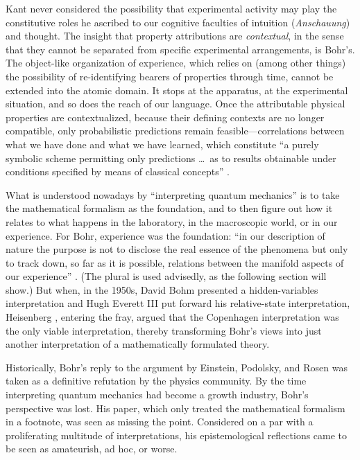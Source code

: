\documentclass[12pt]{article}
\begin{document}
Kant never considered the possibility that experimental activity may play the constitutive roles he ascribed to our cognitive faculties of {intuition} (\emph{Anschauung}) and thought. The insight that property attributions are \emph{contextual}, in the sense that they cannot be separated from specific experimental arrangements, is Bohr's. The object-like organization of experience, which relies on (among other things) the possibility of re-identifying bearers of properties through time, cannot be extended into the atomic domain. It stops at the apparatus, at the experimental situation, and so does the reach of our language. Once the attributable physical properties are contextualized, because their defining contexts are no longer compatible, only probabilistic predictions remain feasible---correlations between what we have done and what we have learned, which constitute ``a purely symbolic scheme permitting only predictions \dots\ as to results obtainable under conditions specified by means of classical concepts'' \cite{Bohr-APHKa}.

What is understood nowadays by ``interpreting quantum mechanics'' is to take the mathematical formalism as the foundation, and to then figure out how it relates to what happens in the laboratory, in the macroscopic world, or in our experience. For Bohr, experience was the foundation: ``in our description of nature the purpose is not to disclose the real essence of the phenomena but only to track down, so far as it is possible, relations between the manifold aspects of our experience'' \cite{BohrATDNa}. (The plural is used advisedly, as the following section will show.) But when, in the 1950s, David Bohm \cite{BohmHV} presented a hidden-variables interpretation and Hugh Everett III \cite{EverettRSF} put forward his relative-state interpretation, Heisenberg \cite{Heisenberg_PP}, entering the fray, argued that the Copenhagen interpretation was the only viable interpretation, thereby transforming Bohr's views into just another interpretation of a mathematically formulated theory.

Historically, Bohr's reply \cite{BohrEPRreply} to the argument by Einstein, Podolsky, and Rosen \cite{EPR} was taken as a definitive refutation by the physics community. By the time interpreting quantum mechanics had become a growth industry, Bohr's perspective was lost. His paper, which only treated the mathematical formalism in a footnote, was seen as missing the point. Considered on a par with a proliferating multitude of interpretations, his epistemological reflections came to be seen as amateurish, ad hoc, or worse.
\end{document}
